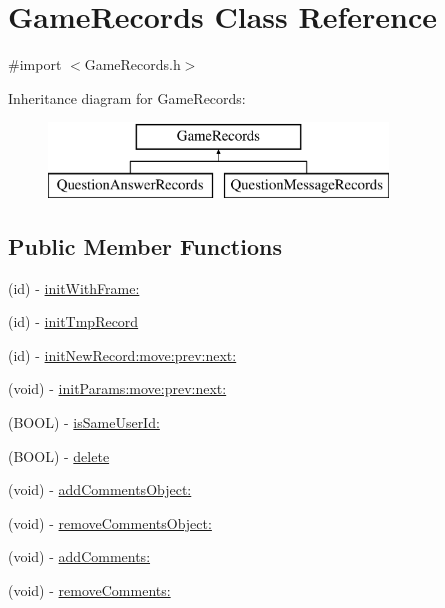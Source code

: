 \hypertarget{interface_game_records}{
\section{GameRecords Class Reference}
\label{interface_game_records}
}


{\ttfamily \#import $<$GameRecords.h$>$}

Inheritance diagram for GameRecords:\begin{figure}[H]
\begin{center}
\leavevmode
\includegraphics[height=2.000000cm]{interface_game_records}
\end{center}
\end{figure}
\subsection*{Public Member Functions}
\begin{DoxyCompactItemize}
\item 
(id) -\/ \hyperlink{interface_game_records_a4c007751279d28c5ef9a555185af647b}{initWithFrame:}
\item 
(id) -\/ \hyperlink{interface_game_records_ac3933518fde18be29721aadd915dd419}{initTmpRecord}
\item 
(id) -\/ \hyperlink{interface_game_records_a9175f5a52d0e12f805adacda7d3b14de}{initNewRecord:move:prev:next:}
\item 
(void) -\/ \hyperlink{interface_game_records_a8e6c20d25ddaea0647f38e2e2ef17344}{initParams:move:prev:next:}
\item 
(BOOL) -\/ \hyperlink{interface_game_records_a2dab8b4b0b68c5cbb28cf4374cc82c8e}{isSameUserId:}
\item 
(BOOL) -\/ \hyperlink{interface_game_records_a827169d0d5899335d7f6239c9c9c4643}{delete}
\item 
(void) -\/ \hyperlink{interface_game_records_a8f9590c7a25b418a975081c8975d45be}{addCommentsObject:}
\item 
(void) -\/ \hyperlink{interface_game_records_ade7d4e93ddf1c6bcebd60690cfc5b77a}{removeCommentsObject:}
\item 
(void) -\/ \hyperlink{interface_game_records_a7fd8675a4d513ec0e665a045178c86d7}{addComments:}
\item 
(void) -\/ \hyperlink{interface_game_records_aa9ff8413bf66729084a91f9ee7847f2e}{removeComments:}
\end{DoxyCompactItemize}
